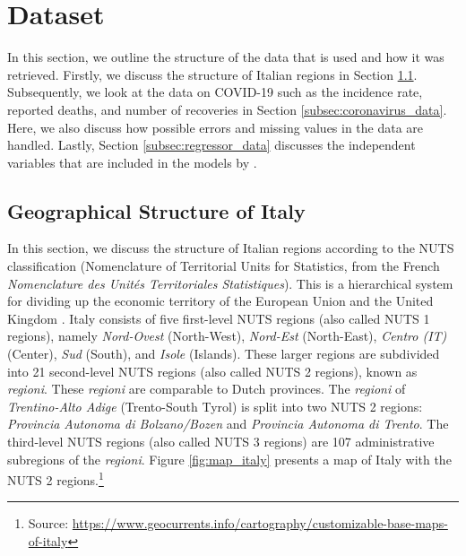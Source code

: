 \documentclass[12pt]{article}
\begin{document}
	\section{Dataset} \label{sec:dataset}
	In this section, we outline the structure of the data that is used and how it was retrieved. Firstly, we discuss the structure of Italian regions in Section \ref{subsec:italy_geography}. Subsequently, we look at the data on COVID-19 such as the incidence rate, reported deaths, and number of recoveries in Section \ref{subsec:coronavirus_data}. Here, we also discuss how possible errors and missing values in the data are handled. Lastly, Section \ref{subsec:regressor_data} discusses the independent variables that are included in the models by \textcite{adda2016economic}.
	
	\subsection{Geographical Structure of Italy} \label{subsec:italy_geography}
	In this section, we discuss the structure of Italian regions according to the NUTS classification (Nomenclature of Territorial Units for Statistics, from the French \textit{Nomenclature des Unités Territoriales Statistiques}). This is a hierarchical system for dividing up the economic territory of the European Union and the United Kingdom \parencite{background-nuts}. Italy consists of five first-level NUTS regions (also called NUTS 1 regions), namely \textit{Nord-Ovest} (North-West), \textit{Nord-Est} (North-East), \textit{Centro (IT)} (Center), \textit{Sud} (South), and \textit{Isole} (Islands). These larger regions are subdivided into 21 second-level NUTS regions (also called NUTS 2 regions), known as \textit{regioni}. These \textit{regioni} are comparable to Dutch provinces. The \textit{regioni} of \textit{Trentino-Alto Adige} (Trento-South Tyrol) is split into two NUTS 2 regions: \textit{Provincia Autonoma di Bolzano/Bozen} and \textit{Provincia Autonoma di Trento}. The third-level NUTS regions (also called NUTS 3 regions) are 107 administrative subregions of the \textit{regioni}. Figure \ref{fig:map_italy} presents a map of Italy with the NUTS 2 regions.\footnote{Source: \url{https://www.geocurrents.info/cartography/customizable-base-maps-of-italy}}
	
\end{document}
